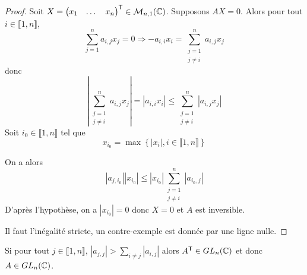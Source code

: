 \documentclass[12pt]{article}
\begin{document}
\begin{proof}
    Soit $X=\begin{pmatrix}
        x_{1}&\dots&x_{n}
    \end{pmatrix}^{\mathsf{T}}\in\mathcal{M}_{n,1}(\mathbb{C})$. Supposons $AX=0$. Alors pour tout $i\in\llbracket1,n\rrbracket$,
    \begin{equation}
        \sum_{j=1}^{n}a_{i,j}x_{j}=0\Rightarrow -a_{i,i}x_{i}=\sum_{\substack{j=1\\j\neq i}}^{n}a_{i,j}x_{j}
    \end{equation}
    donc 
    \begin{equation}
        \left\lvert\sum_{\substack{j=1\\j\neq i}}^{n}a_{i,j}x_{j}\right\rvert=\left\lvert a_{i,i}x_{i}\right\rvert\leqslant\sum_{\substack{j=1\\j\neq i}}^{n}\left\lvert a_{i,j}x_{j}\right\rvert
    \end{equation}
    Soit $i_{0}\in\llbracket1,n\rrbracket$ tel que 
    \begin{equation}
        x_{i_{0}}=\max\left\lbrace\left\lvert x_{i}\right\rvert,i\in\llbracket1,n\rrbracket\right\rbrace
    \end{equation}

    On a alors 
    \begin{equation}
        \left\lvert a_{j,i_{0}}\right\rvert\left\lvert x_{i_{0}}\right\rvert\leqslant \left\lvert x_{i_{0}}\right\rvert\sum_{\substack{j=1\\j\neq i}}^{n}\left\lvert a_{i_{0},j}\right\rvert
    \end{equation}
    D'après l'hypothèse, on a $\left\lvert x_{i_{0}}\right\rvert=0$ donc $X=0$ et $A$ est inversible.

    Il faut l'inégalité stricte, un contre-exemple est donnée par une ligne nulle.
\end{proof}

\begin{remark}
    Si pour tout $j\in\llbracket1,n\rrbracket$, $\left\lvert a_{j,j}\right\rvert>\sum_{i\neq j}\left\lvert a_{i,j}\right\rvert$ alors $A^{\mathsf{T}}\in GL_{n}(\mathbb{C})$ et donc $A\in GL_{n}(\mathbb{C})$.
\end{remark}
\end{document}
